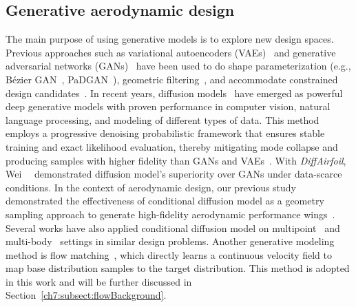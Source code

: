 \subsection{Generative aerodynamic design}
The main purpose of using generative models is to explore new design spaces. Previous approaches such as variational autoencoders (VAEs)~\cite{ai.Kingma2014} and generative adversarial networks (GANs)~\cite{ai.Goodfellow2020} have been used to do shape parameterization (e.g., B\'ezier GAN~\cite{aa.Chen2020}, PaDGAN~\cite{aa.Chen2021b}), geometric filtering~\cite{aa.Li2020}, and accommodate constrained design candidates~\cite{aa.Achour2020,aa.Wang2022,aa.Lei2021}. In recent years, diffusion models~\cite{ai.Ho2020,ai.Song2021c} have emerged as powerful deep generative models with proven performance in computer vision, natural language processing, and modeling of different types of data. This method employs a progressive denoising probabilistic framework that ensures stable training and exact likelihood evaluation, thereby mitigating mode collapse and producing samples with higher fidelity than GANs and VAEs~\cite{ai.Ho2020,ai.Song2021c}. With \textit{DiffAirfoil}, Wei~\etal~\cite{aa.Wei2024} demonstrated diffusion model’s superiority over GANs under data-scarce conditions. In the context of aerodynamic design, our previous study demonstrated the effectiveness of conditional diffusion model as a geometry sampling approach to generate high-fidelity aerodynamic performance wings~\cite{aa.Yang2024}. Several works have also applied conditional diffusion model on multipoint~\cite{aa.Lin2025} and multi-body~\cite{aa.Wu2024} settings in similar design problems. Another generative modeling method is flow matching~\cite{ai.BenHamu2024}, which directly learns a continuous velocity field to map base distribution samples to the target distribution. This method is adopted in this work and will be further discussed in Section~\ref{ch7:subsect:flowBackground}.

